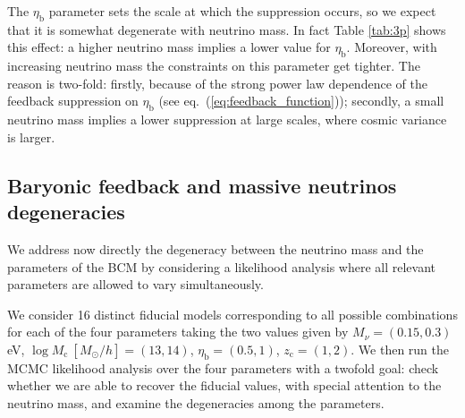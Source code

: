 \documentclass[a4paper,11pt]{article}
\def\etab{\eta_{\mathrm b}}
\def\logMc{\log M_{\mathrm c}}
\newcommand{\eq}[1]{eq.~(\ref{#1})}
\begin{document}
The $\eta_\mathrm b$ parameter sets the scale at which the suppression occurs, so we expect that it is somewhat degenerate with neutrino mass.
In fact Table \ref{tab:3p} shows this effect: a higher neutrino mass implies a lower value for $\eta_\mathrm b$.
Moreover, with increasing neutrino mass the constraints on this parameter get tighter.
The reason is two-fold: firstly, because of the strong power law dependence of the feedback suppression on $\eta_\mathrm b$ (see \eq{eq:feedback_function}); secondly, a small neutrino mass implies a lower suppression at large scales, where cosmic variance is larger.

\subsection{Baryonic feedback and massive neutrinos degeneracies}
\label{sec:feedback_nu}

We address now directly the degeneracy between the neutrino mass and the parameters of the BCM by considering a likelihood analysis where all relevant parameters are allowed to vary simultaneously.

We consider 16 distinct fiducial models corresponding to all possible combinations for each of the four parameters taking the two values given by  $M_\nu = (0.15, 0.3)$ eV, $\logMc \ [M_\odot/h]= (13, 14)$, $\etab = (0.5, 1)$, $z_\mathrm c = (1, 2)$.
We then run the MCMC likelihood analysis over the four parameters with a twofold goal: check whether we are able to recover the fiducial values, with special attention to the neutrino mass, and examine the degeneracies among the parameters.
\end{document}
